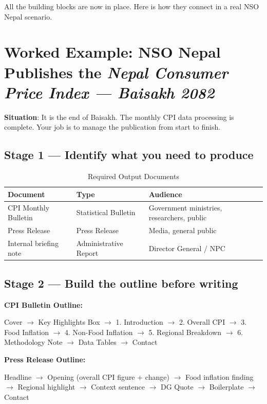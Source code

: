 \documentclass[11pt,a4paper,oneside]{book}
\begin{document}
All the building blocks are now in place. Here is how they connect in a real NSO Nepal scenario.

\section{Worked Example: NSO Nepal Publishes the \emph{Nepal Consumer Price Index --- Baisakh 2082}}

\textbf{Situation}: It is the end of Baisakh. The monthly CPI data processing is complete. Your job is to manage the publication from start to finish.

\subsection*{Stage 1 --- Identify what you need to produce}

\begin{table}[htbp]
\centering
\caption{Required Output Documents}
\label{tab:cpi_outputs}
\vspace{0.3cm}
\begin{tabularx}{\textwidth}{l l X}
\toprule
\textbf{Document} & \textbf{Type} & \textbf{Audience} \\
\midrule
CPI Monthly Bulletin & Statistical Bulletin & Government ministries, researchers, public \\
\addlinespace
Press Release & Press Release & Media, general public \\
\addlinespace
Internal briefing note & Administrative Report & Director General / NPC \\
\bottomrule
\end{tabularx}
\end{table}

\subsection*{Stage 2 --- Build the outline before writing}

\noindent\textbf{CPI Bulletin Outline:}
\begin{tcolorbox}[nsolightbox]
Cover $\rightarrow$ Key Highlights Box $\rightarrow$ 1. Introduction $\rightarrow$ 2. Overall CPI $\rightarrow$ 3. Food Inflation $\rightarrow$ 4. Non-Food Inflation $\rightarrow$ 5. Regional Breakdown $\rightarrow$ 6. Methodology Note $\rightarrow$ Data Tables $\rightarrow$ Contact
\end{tcolorbox}

\noindent\textbf{Press Release Outline:}
\begin{tcolorbox}[nsolightbox]
Headline $\rightarrow$ Opening (overall CPI figure + change) $\rightarrow$ Food inflation finding $\rightarrow$ Regional highlight $\rightarrow$ Context sentence $\rightarrow$ DG Quote $\rightarrow$ Boilerplate $\rightarrow$ Contact
\end{tcolorbox}
\end{document}
